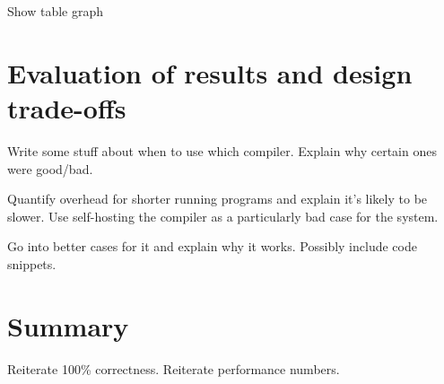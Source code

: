 Show table graph

\section{Evaluation of results and design trade-offs}

Write some stuff about when to use which compiler. Explain why certain ones were good/bad.

Quantify overhead for shorter running programs and explain it's likely to be slower. Use
self-hosting the compiler as a particularly bad case for the system.

Go into better cases for it and explain why it works. Possibly include code snippets.

\section{Summary}

Reiterate 100\% correctness. Reiterate performance numbers.